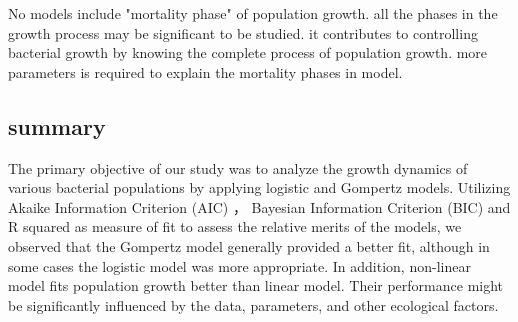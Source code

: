 \documentclass{article}
\begin{document}
No models include "mortality phase" of  population growth. all the phases in the growth process may be significant to be studied. it contributes to controlling bacterial growth by knowing the complete process of population growth. more parameters is required to explain the mortality phases in model.

\subsection{summary}
The primary objective of our study was to analyze the growth dynamics of various bacterial populations by applying logistic and Gompertz models. Utilizing Akaike Information Criterion (AIC) ， Bayesian Information Criterion (BIC) and R squared as measure of fit to assess the relative merits of the models, we observed that the Gompertz model generally provided a better fit, although in some cases the logistic model was more appropriate. In addition, non-linear model fits population growth better than linear model. Their performance might be significantly influenced by the data, parameters, and other ecological factors. 

\newpage  

 

\end{document}
